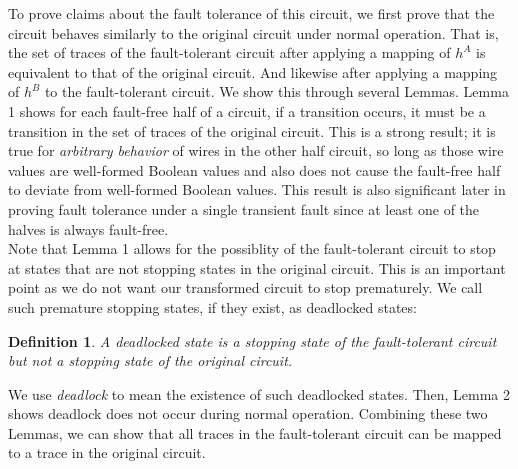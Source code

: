 \documentclass[12pt]{report}
\newtheorem*{definition}{Definition}
\begin{document}
To prove claims about the fault tolerance of this circuit, we first prove that the circuit behaves similarly to the original circuit under normal operation.  That is, the set of traces of the fault-tolerant circuit after applying a mapping of $h^A$ is equivalent to that of the original circuit.  And likewise after applying a mapping of $h^B$ to the fault-tolerant circuit.  We show this through several Lemmas. Lemma 1 shows for each fault-free half of a circuit, if a transition occurs, it must be a transition in the set of traces of the
 original circuit.  This is a strong result; it is true for  {\em arbitrary behavior} of
wires in the other half circuit, so long as those wire values are well-formed Boolean values and also does not cause the fault-free half to deviate from well-formed Boolean values.  
This result is also significant later in proving fault tolerance under a single transient fault since at least one of the halves is always fault-free.  %
\\

Note that Lemma 1 allows for the possiblity of the fault-tolerant circuit to stop at states that are not stopping states in the original circuit.  This is an important point as we do not want our transformed circuit to stop prematurely.  We call such premature stopping states, if they exist, as deadlocked states:
\begin{definition}A {\em deadlocked state} is a stopping state of the fault-tolerant circuit but not a stopping state of the original circuit.\end{definition}
We use {\em deadlock} to mean the existence of such deadlocked states.  
Then, Lemma 2 shows deadlock does not occur during normal operation.  Combining these two Lemmas, we can show that all traces in the fault-tolerant circuit can be mapped to a trace in the original circuit.\\
\end{document}
